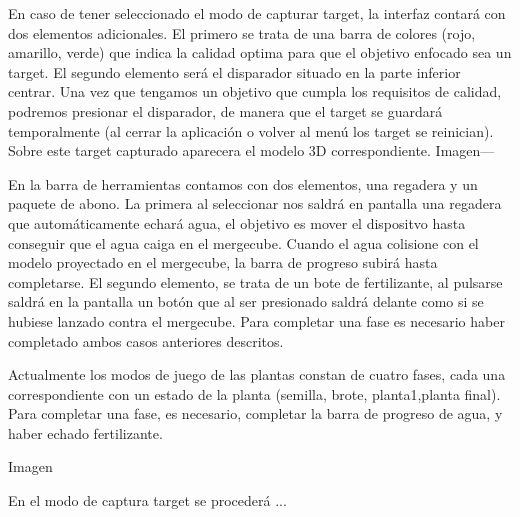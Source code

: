 
En caso de tener seleccionado el modo de capturar target, la interfaz contará con dos elementos adicionales. El primero se trata de una barra de colores (rojo, amarillo, verde) que indica la calidad optima para que el objetivo enfocado sea un target. El segundo elemento será el disparador situado en la parte inferior centrar. Una vez que tengamos un objetivo que cumpla los requisitos de calidad, podremos presionar el disparador, de manera que el target se guardará temporalmente (al cerrar la aplicación o volver al menú los target se reinician). Sobre este target capturado aparecera el modelo 3D correspondiente. Imagen---

En la barra de herramientas contamos con dos elementos, una regadera y un paquete de abono. La primera al seleccionar nos saldrá en pantalla una regadera que automáticamente echará agua, el objetivo es mover el dispositvo hasta conseguir que el agua caiga en el mergecube. Cuando el agua colisione con el modelo proyectado en el mergecube, la barra de progreso subirá hasta completarse. 
El segundo elemento, se trata de un bote de fertilizante, al pulsarse saldrá en la pantalla un botón que al ser presionado saldrá delante como si se hubiese lanzado contra el mergecube.
Para completar una fase es necesario haber completado ambos casos anteriores descritos.

Actualmente los modos de juego de las plantas constan de cuatro fases, cada una correspondiente con un estado de la planta (semilla, brote, planta1,planta final). Para completar una fase, es necesario, completar la barra de progreso de agua, y haber echado fertilizante.

Imagen


En el modo de captura target se procederá ...


 

